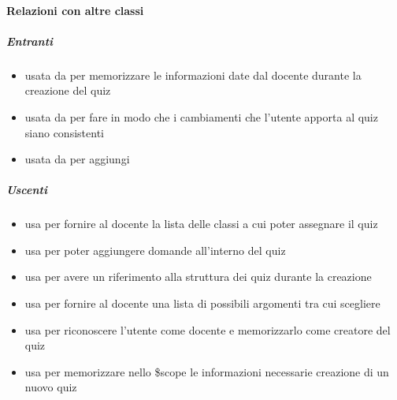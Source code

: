 \paragraph{Relazioni con altre classi}
\subparagraph{Entranti}
\begin{itemize}
\item usata da  per memorizzare le informazioni date dal docente durante la creazione del quiz
\item usata da  per fare in modo che i cambiamenti che l'utente apporta al quiz siano consistenti
\item usata da  per aggiungi
\end{itemize}
\subparagraph{Uscenti}
\begin{itemize}
\item usa  per fornire al docente la lista delle classi a cui poter assegnare il quiz
\item usa  per poter aggiungere domande all'interno del quiz
\item usa  per avere un riferimento alla struttura dei quiz durante la creazione
\item usa  per fornire al docente una lista di possibili argomenti tra cui scegliere
\item usa  per riconoscere l'utente come docente e memorizzarlo come creatore del quiz
\item usa  per memorizzare nello \$scope le informazioni necessarie creazione di un nuovo quiz
\end{itemize}
